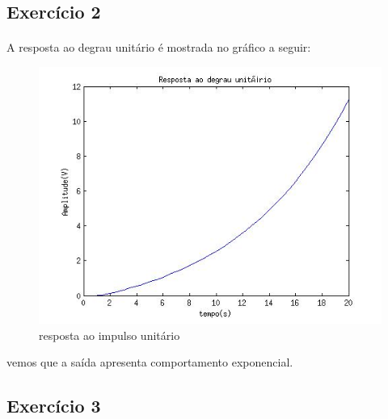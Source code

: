 \documentclass[a4paper,11pt]{article}
\begin{document}
\subsection{Exercício 2}
\paragraph{}A resposta ao degrau unitário é mostrada no gráfico a seguir:
\FloatBarrier
\begin{figure}[!htp]
		\centering
		\includegraphics[scale = 0.5]{./images/exerc2-saida.jpg}
		\caption{resposta ao impulso unitário}
		\label{fig:circuit2-saida}
\end{figure}
\FloatBarrier
vemos que a saída apresenta comportamento exponencial.

\subsection{Exercício 3}
\end{document}
